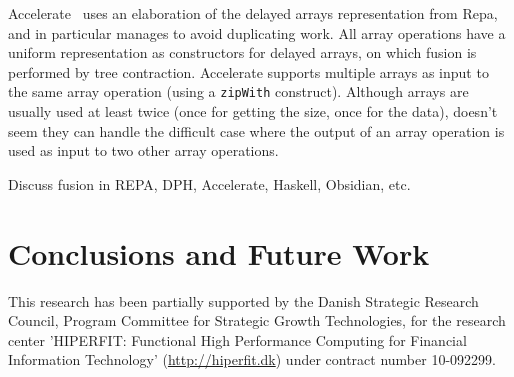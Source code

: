 \documentclass{sigplanconf}  %
\begin{document}
Accelerate~\cite{mcdonell2013optimising} uses an elaboration of the
delayed arrays representation from Repa, and in particular manages to
avoid duplicating work.  All array operations have a uniform
representation as constructors for delayed arrays, on which fusion is
performed by tree contraction.  Accelerate supports multiple arrays as
input to the same array operation (using a {\tt zipWith} construct).
Although arrays are usually used at least twice (once for getting the
size, once for the data), doesn't seem they can handle the difficult
case where the output of an array operation is used as input to two
other array operations.

Discuss fusion in REPA, DPH, Accelerate, Haskell, Obsidian, etc.

\section{Conclusions and Future Work}
\label{sec:Concl}




%



\acks
This research has been partially supported by the Danish
Strategic Research Council, Program Committee for Strategic Growth
Technologies, for the research center 'HIPERFIT: Functional High
Performance Computing for Financial Information Technology'
(\url{http://hiperfit.dk}) under contract number 10-092299.




\softraggedright

\end{document}
